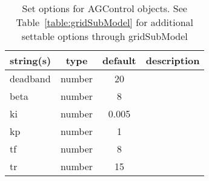 \begin{table}[ht]
\centering
\begin{tabular}{p{5cm} c c p{7cm}}
\hline
string(s) & type & default & description \\
\hline
deadband & number & 20 & \\
beta & number & 8 & \\
ki & number & 0.005 & \\
kp & number & 1 & \\
tf & number & 8 & \\
tr & number & 15 & \\
\hline
\end{tabular}
\caption{Set options for AGControl objects. See Table~\ref{table:gridSubModel} for additional settable options through gridSubModel}
\label{table:AGControl}
\end{table}

